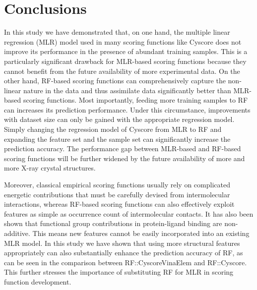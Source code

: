 \documentclass[linenumbers]{bmcart}
\begin{document}
\section*{Conclusions}

In this study we have demonstrated that, on one hand, the multiple linear regression (MLR) model used in many scoring functions like Cyscore does not improve its performance in the presence of abundant training samples. This is a particularly significant drawback for MLR-based scoring functions because they cannot benefit from the future availability of more experimental data. On the other hand, RF-based scoring functions can comprehensively capture the non-linear nature in the data and thus assimilate data significantly better than MLR-based scoring functions. Most importantly, feeding more training samples to RF can increases its prediction performance. Under this circumstance, improvements with dataset size can only be gained with the appropriate regression model. Simply changing the regression model of Cyscore from MLR to RF and expanding the feature set and the sample set can significantly increase the prediction accuracy. The performance gap between MLR-based and RF-based scoring functions will be further widened by the future availability of more and more X-ray crystal structures.

Moreover, classical empirical scoring functions usually rely on complicated energetic contributions that must be carefully devised from intermolecular interactions, whereas RF-based scoring functions can also effectively exploit features as simple as occurrence count of intermolecular contacts. It has also been shown that functional group contributions in protein-ligand binding are non-additive. This means new features cannot be easily incorporated into an existing MLR model. In this study we have shown that using more structural features appropriately can also substantially enhance the prediction accuracy of RF, as can be seen in the comparison between RF::CyscoreVinaElem and RF::Cyscore. This further stresses the importance of substituting RF for MLR in scoring function development.

\end{document}
